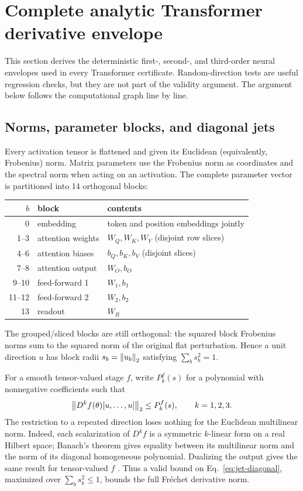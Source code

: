 \section{Complete analytic Transformer derivative envelope}
\label{app:transformer-jet}

This section derives the deterministic first-, second-, and third-order neural
envelopes used in every Transformer certificate.  Random-direction tests are
useful regression checks, but they are not part of the validity argument.  The
argument below follows the computational graph line by line.

\subsection{Norms, parameter blocks, and diagonal jets}

Every activation tensor is flattened and given its Euclidean (equivalently,
Frobenius) norm.  Matrix parameters use the Frobenius norm as coordinates and
the spectral norm when acting on an activation.  The complete parameter vector
is partitioned into 14 orthogonal blocks:
\begin{center}
\small
\begin{tabular}{rll}
\toprule
$b$ & block & contents \\
\midrule
0 & embedding & token and position embeddings jointly \\
1--3 & attention weights & $W_Q,W_K,W_V$ (disjoint row slices) \\
4--6 & attention biases & $b_Q,b_K,b_V$ (disjoint slices) \\
7--8 & attention output & $W_O,b_O$ \\
9--10 & feed-forward 1 & $W_1,b_1$ \\
11--12 & feed-forward 2 & $W_2,b_2$ \\
13 & readout & $W_R$ \\
\bottomrule
\end{tabular}
\end{center}
The grouped/sliced blocks are still orthogonal: the squared block Frobenius
norms sum to the squared norm of the original flat perturbation.  Hence a unit
direction $u$ has block radii $s_b=\left\lVert u_b\right\rVert_2$ satisfying
$\sum_b s_b^2=1$.

For a smooth tensor-valued stage $f$, write $P_k^f(s)$ for a polynomial with
nonnegative coefficients such that
\begin{equation}
 \left\lVert D^k f(\theta)[u,\ldots,u]\right\rVert_2\le P_k^f(s),\qquad k=1,2,3.
 \label{eq:jet-diagonal}
\end{equation}
The restriction to a repeated direction loses nothing for the Euclidean
multilinear norm.  Indeed, each scalarization of $D^k f$ is a symmetric
$k$-linear form on a real Hilbert space; Banach's theorem gives equality
between its multilinear norm and the norm of its diagonal homogeneous
polynomial.  Dualizing the output gives the same result for tensor-valued $f$
\citep{carando2019symmetric}.  Thus a valid bound on
Eq.~\eqref{eq:jet-diagonal}, maximized over $\sum_b s_b^2\le1$, bounds the full
Fr\'echet derivative norm.

